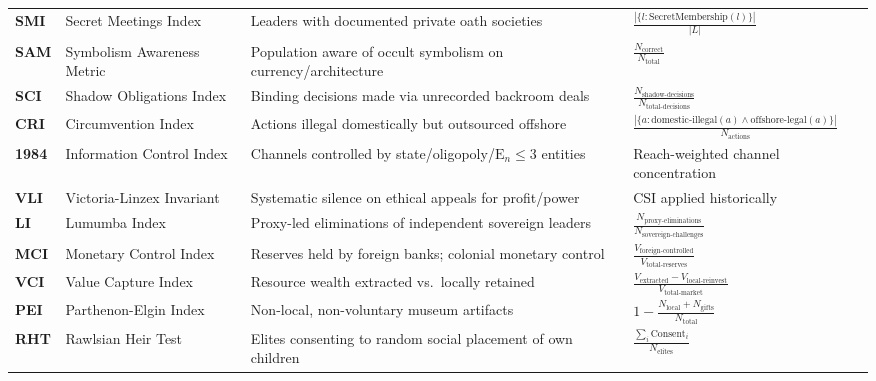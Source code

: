 \documentclass[11pt,a4paper]{article}
\theoremstyle{definition}
\theoremstyle{remark}
\begin{document}
\begin{longtable}{@{}p{}p{}
  p{}p{}@{}}
\textbf{SMI} & Secret Meetings Index &
  Leaders with documented private oath societies &
  $\frac{|\{l: \text{SecretMembership}(l)\}|}{|L|}$ \\[4pt]

\textbf{SAM} & Symbolism Awareness Metric &
  Population aware of occult symbolism on currency/architecture &
  $\frac{N_\text{correct}}{N_\text{total}}$ \\[4pt]

\textbf{SCI} & Shadow Obligations Index &
  Binding decisions made via unrecorded backroom deals &
  $\frac{N_\text{shadow-decisions}}{N_\text{total-decisions}}$ \\[4pt]

\textbf{CRI} & Circumvention Index &
  Actions illegal domestically but outsourced offshore &
  $\frac{|\{a: \text{domestic-illegal}(a) \wedge \text{offshore-legal}(a)\}|}{N_\text{actions}}$ \\[4pt]

\textbf{1984} & Information Control Index &
  Channels controlled by state/oligopoly/$\text{E}_n \leq 3$ entities &
  Reach-weighted channel concentration \\[4pt]

\textbf{VLI} & Victoria-Linzex Invariant &
  Systematic silence on ethical appeals for profit/power &
  CSI applied historically \\[4pt]

\textbf{LI} & Lumumba Index &
  Proxy-led eliminations of independent sovereign leaders &
  $\frac{N_\text{proxy-eliminations}}{N_\text{sovereign-challenges}}$ \\[4pt]

\textbf{MCI} & Monetary Control Index &
  Reserves held by foreign banks; colonial monetary control &
  $\frac{V_\text{foreign-controlled}}{V_\text{total-reserves}}$ \\[4pt]

\textbf{VCI} & Value Capture Index &
  Resource wealth extracted vs.\ locally retained &
  $\frac{V_\text{extracted} - V_\text{local-reinvest}}{V_\text{total-market}}$ \\[4pt]

\textbf{PEI} & Parthenon-Elgin Index &
  Non-local, non-voluntary museum artifacts &
  $1 - \frac{N_\text{local} + N_\text{gifts}}{N_\text{total}}$ \\[4pt]

\textbf{RHT} & Rawlsian Heir Test &
  Elites consenting to random social placement of own children &
  $\frac{\sum_i \text{Consent}_i}{N_\text{elites}}$ \\[4pt]


\end{longtable}
\end{document}
